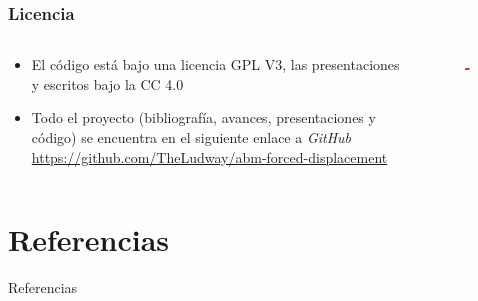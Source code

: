 \documentclass[17pt, t, lualatex]{beamer}
\begin{document}
\begin{frame}
  \frametitle{Licencia}

\begin{columns}
  \begin{column}{.5\textwidth}
    \begin{itemize}
      \item El código está bajo una licencia GPL V3, las presentaciones y escritos bajo la CC 4.0
      \item Todo el proyecto (bibliografía, avances, presentaciones y código) se encuentra en el siguiente enlace a \textit{GitHub} \url{https://github.com/TheLudway/abm-forced-displacement}
    \end{itemize}
  \end{column}

  \begin{column}{.5\textwidth}
    \begin{figure}[ht]
      \centering
      \includegraphics[width = 0.7\textwidth]{img/gpl.png}
    \end{figure}

  \end{column}
\end{columns}


\end{frame}




\section{Referencias}

\insertsectionpage
\begin{frame}[allowframebreaks]{Referencias}
  \printbibliography
\end{frame}


\insertendpage
\end{document}
